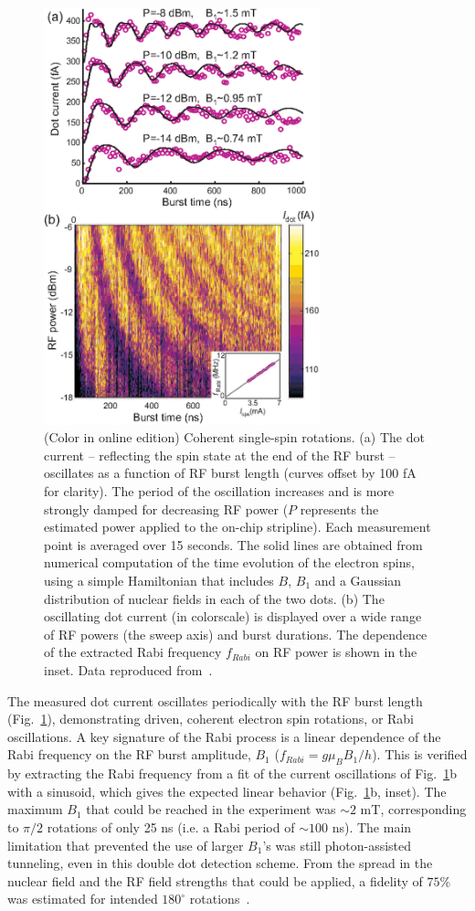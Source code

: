 \documentclass[rmp,twocolumn,aps]{revtex4}
\begin{document}
\begin{figure}[htb]
\includegraphics[width=8cm]{hanson_fig45.eps}
\caption{(Color in online edition) Coherent single-spin rotations. (a) The dot current --
reflecting the spin state at the end of the RF burst -- oscillates
as a function of RF burst length (curves offset by 100 fA for
clarity). The period of the oscillation increases and is more
strongly damped for decreasing RF power ($P$ represents the
estimated power applied to the on-chip stripline). Each
measurement point is averaged over 15 seconds. The solid lines are
obtained from numerical computation of the time evolution of the
electron spins, using a simple Hamiltonian that includes $B$,
$B_{1}$ and a Gaussian distribution of nuclear fields in each of
the two dots. (b) The oscillating dot current (in colorscale) is displayed over a wide
range of RF powers (the sweep axis) and burst durations. The
dependence of the extracted Rabi frequency $f_{Rabi}$ on RF power
is shown in the inset. Data reproduced from~\textcite{koppens06}.} 
\label{fig:ESR_Rabi}
\end{figure}

The measured dot current oscillates periodically with the RF burst
length (Fig.~\ref{fig:ESR_Rabi}), demonstrating driven, coherent
electron spin rotations, or Rabi oscillations. A key signature of
the Rabi process is a linear dependence of the Rabi frequency on
the RF burst amplitude, $B_1$ ($f_{Rabi}= g \mu_B B_1/h$). This is
verified by extracting the Rabi frequency from a fit of the
current oscillations of Fig.~\ref{fig:ESR_Rabi}b with a sinusoid,
which gives the expected linear behavior
(Fig.~\ref{fig:ESR_Rabi}b, inset). The maximum $B_1$ that could be
reached in the experiment was $\sim 2$ mT, corresponding to
$\pi/2$ rotations of only 25 ns (i.e. a Rabi period of $\sim 100$
ns). The main limitation that prevented the use of larger $B_1$'s
was still photon-assisted tunneling, even in this double dot
detection scheme. From the spread in the nuclear field and the RF field strengths that could be applied, a fidelity of $75\%$ was estimated for intended $180^\circ$ rotations~\cite{koppens06}.
\end{document}
